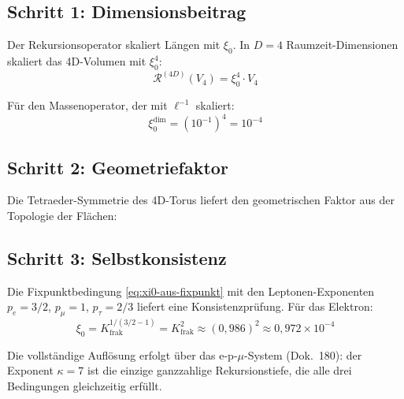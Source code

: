 \subsection{Schritt 1: Dimensionsbeitrag}

Der Rekursionsoperator skaliert Längen mit $\xi_0$. In $D=4$
Raumzeit-Dimensionen skaliert das 4D-Volumen mit $\xi_0^4$:
\begin{equation}
  \mathcal{R}^{(4D)}(V_4) = \xi_0^4 \cdot V_4
\end{equation}

Für den Massenoperator, der mit $\ell^{-1}$ skaliert:
\begin{equation}
  \xi_0^{\text{dim}} = (10^{-1})^4 = 10^{-4}
\end{equation}

\subsection{Schritt 2: Geometriefaktor}

Die Tetraeder-Symmetrie des 4D-Torus liefert den geometrischen Faktor
aus der Topologie der Flächen:

\begin{center}
{\footnotesize
{}}
\end{center}

\subsection{Schritt 3: Selbstkonsistenz}

Die Fixpunktbedingung \eqref{eq:xi0-aus-fixpunkt} mit den Leptonen-Exponenten
$p_e = 3/2$, $p_\mu = 1$, $p_\tau = 2/3$ liefert eine Konsistenzprüfung.
Für das Elektron:
\begin{equation}
  \xi_0 = K_{\text{frak}}^{1/(3/2 - 1)}
  = K_{\text{frak}}^2
  \approx (0{,}986)^2 \approx 0{,}972 \times 10^{-4}
\end{equation}

Die vollständige Auflösung erfolgt über das e-p-$\mu$-System
(Dok.~180): der Exponent $\kappa = 7$ ist die einzige ganzzahlige
Rekursionstiefe, die alle drei Bedingungen gleichzeitig erfüllt.

